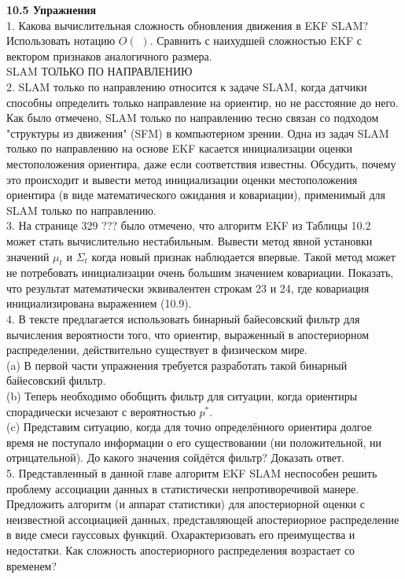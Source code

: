 \documentclass[10pt,a4paper]{article}
\begin{document}
\textbf{10.5	Упражнения}\\

1.	Какова вычислительная сложность обновления движения в EKF SLAM? Использовать нотацию $O(\,\,)$. Сравнить с наихудшей сложностью EKF с вектором признаков аналогичного размера.\\

SLAM ТОЛЬКО ПО НАПРАВЛЕНИЮ\\
2.	 SLAM только по направлению относится к задаче SLAM, когда датчики способны определить только направление на ориентир, но не расстояние до него. Как было отмечено, SLAM только по направлению тесно связан со подходом "структуры из движения" (SFM) в компьютерном зрении. Одна из задач SLAM только по направлению на основе EKF касается инициализации оценки местоположения ориентира, даже если соответствия известны. Обсудить, почему это происходит и вывести метод инициализации оценки местоположения ориентира (в виде математического ожидания и ковариации), применимый для SLAM только по направлению.\\

3.	На странице 329 ??? было отмечено, что алгоритм EKF из Таблицы 10.2 может стать вычислительно нестабильным. Вывести метод явной установки значений $\mu_t$ и $\varSigma_t$ когда новый признак наблюдается впервые. Такой метод может не потребовать инициализации очень большим значением ковариации. Показать, что результат математически эквивалентен строкам 23 и 24, где ковариация инициализирована выражением (10.9).\\

4.	В тексте предлагается использовать бинарный байесовский фильтр для вычисления вероятности того, что ориентир, выраженный в апостериорном распределении, действительно существует в физическом мире.\\

(a)	В первой части упражнения требуется разработать такой бинарный байесовский фильтр.\\

(b)	Теперь необходимо обобщить фильтр для ситуации, когда ориентиры спорадически исчезают с вероятностью $p^*$.\\

(c)	Представим ситуацию, когда для точно определённого ориентира долгое время не поступало информации о его существовании (ни положительной, ни отрицательной). До какого значения сойдётся фильтр? Доказать ответ.\\

5.	Представленный в данной главе алгоритм EKF SLAM неспособен решить проблему ассоциации данных в статистически непротиворечивой манере. Предложить алгоритм (и  аппарат статистики) для апостериорной оценки с неизвестной ассоциацией данных, представляющей апостериорное распределение в виде смеси гауссовых функций. Охарактеризовать его преимущества и недостатки. Как сложность апостериорного распределения возрастает со временем?\\
\end{document}
